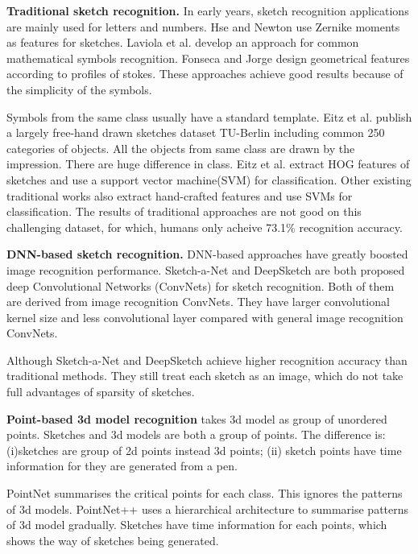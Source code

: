 \textbf{Traditional sketch recognition.} In early years, sketch recognition applications \cite{Hse2004SketchedSR, LaViola2004MathPad2AS, Fonseca2000UsingFL} are mainly used for letters and numbers. Hse and Newton \cite{Hse2004SketchedSR} use Zernike moments as features for sketches. Laviola et al. \cite{LaViola2004MathPad2AS} develop an approach for common mathematical symbols recognition. Fonseca and Jorge \cite{Fonseca2000UsingFL} design geometrical features  according to profiles of stokes. These approaches achieve good results because of the simplicity of the symbols.

Symbols from the same class usually have a standard template. Eitz et al. \cite{Eitz2012HowDH} publish a largely free-hand drawn sketches dataset TU-Berlin including common 250 categories of objects. All the objects from same class are drawn by the impression. There are huge difference in class. Eitz et al. extract HOG features of sketches and use a support vector machine(SVM) for classification. Other existing traditional works \cite{LiHSG15, Schneider2014SketchCA} also extract hand-crafted features and use SVMs for classification. The results of traditional approaches are not good on this challenging dataset, for which, humans only acheive 73.1\% recognition accuracy. 

\textbf{DNN-based sketch recognition.} DNN-based approaches have greatly boosted image recognition performance. Sketch-a-Net \cite{Yu2015SketchaNetTB} and DeepSketch \cite{Seddati2015DeepSketchDC} are both proposed deep Convolutional Networks (ConvNets) for sketch recognition. Both of them are derived from image recognition ConvNets. They have larger convolutional kernel size and less convolutional layer compared with general image recognition ConvNets.

Although Sketch-a-Net \cite{Yu2015SketchaNetTB} and DeepSketch \cite{Seddati2015DeepSketchDC} achieve higher recognition accuracy than traditional methods. They still treat each sketch as an image, which do not take full advantages of sparsity of sketches.

\textbf{Point-based 3d model recognition} takes 3d model as group of unordered points. Sketches and 3d models are both a group of points. The difference is: (i)sketches are group of 2d points instead 3d points; (ii) sketch points have time information for they are generated from a pen.

PointNet \cite{qi2017pointnet} summarises the critical points for each class. This ignores the patterns of 3d models. PointNet++ \cite{qi2017pointnetplusplus} uses a hierarchical architecture to summarise patterns of 3d model gradually. Sketches have time information for each points, which shows the way of sketches being generated.


